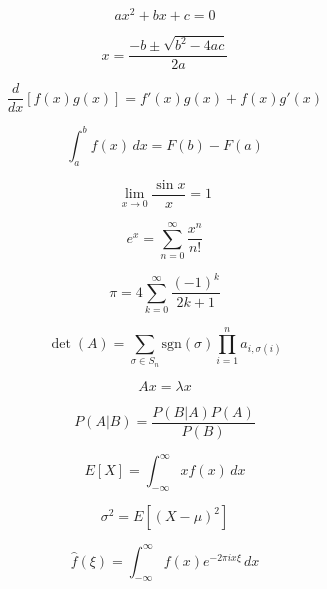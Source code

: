 
\begin{equation}
ax^2 + bx + c = 0
\end{equation}

\begin{equation}
x = \frac{-b \pm \sqrt{b^2 - 4ac}}{2a}
\end{equation}

\begin{equation}
\frac{d}{dx}[f(x)g(x)] = f'(x)g(x) + f(x)g'(x)
\end{equation}

\begin{equation}
\int_a^b f(x) \, dx = F(b) - F(a)
\end{equation}

\begin{equation}
\lim_{x \to 0} \frac{\sin x}{x} = 1
\end{equation}

\begin{equation}
e^x = \sum_{n=0}^{\infty} \frac{x^n}{n!}
\end{equation}

\begin{equation}
\pi = 4 \sum_{k=0}^{\infty} \frac{(-1)^k}{2k+1}
\end{equation}

\begin{equation}
\det(A) = \sum_{\sigma \in S_n} \text{sgn}(\sigma) \prod_{i=1}^n a_{i,\sigma(i)}
\end{equation}

\begin{equation}
Ax = \lambda x
\end{equation}

\begin{equation}
P(A|B) = \frac{P(B|A)P(A)}{P(B)}
\end{equation}

\begin{equation}
E[X] = \int_{-\infty}^{\infty} x f(x) \, dx
\end{equation}

\begin{equation}
\sigma^2 = E[(X - \mu)^2]
\end{equation}

\begin{equation}
\hat{f}(\xi) = \int_{-\infty}^{\infty} f(x) e^{-2\pi i x \xi} \, dx
\end{equation}

